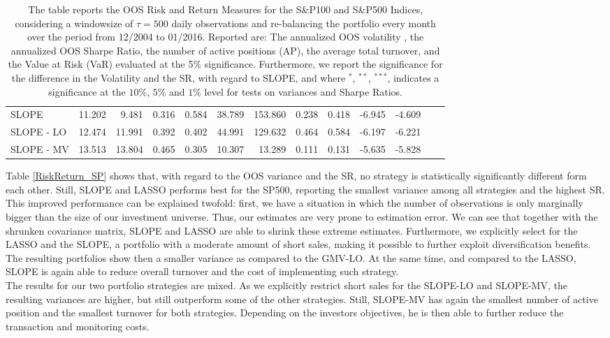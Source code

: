\documentclass[12pt, a4paper]{article}
\begin{document}
\begin{table}[h!]
{\begin{tabular}{ldd dd dd dd dd dd}
    SLOPE & 11.202 & 9.481 & 0.316 & 0.584 & 38.789 & 153.860 & 0.238 & 0.418 & -6.945 & -4.609 \\
    SLOPE - LO & 12.474 & 11.991 & 0.392 & 0.402 & 44.991 & 129.632 & 0.464 & 0.584 & -6.197 & -6.221 \\
    SLOPE - MV & 13.513 & 13.804 & 0.465 & 0.305 & 10.307 & 13.289 & 0.111 & 0.131 & -5.635 & -5.828 \\
    \bottomrule
    \bottomrule
    \end{tabular}%
    }
\captionsetup{font=scriptsize,labelfont=scriptsize, width=\textwidth}
\caption*{The table reports the OOS Risk and Return Measures for the S\&P100 and S\&P500 Indices, considering a windowsize of $\tau = 500$ daily observations and re-balancing the portfolio every month over the period from 12/2004 to 01/2016. Reported are: The annualized OOS volatility , the annualized OOS Sharpe Ratio, the number of active positions (AP), the average total turnover, and the Value at Risk (VaR) evaluated at the 5\% significance. Furthermore, we report the significance for the difference in the Volatility and the SR, with regard to SLOPE, and where $^{*}$, $^{**}$, $^{***}$, indicates a significance at the $10\%$, $5\%$ and $1\%$ level for tests on variances and Sharpe Ratios.}
%
\end{table}%
%
\noindent
Table \ref{RiskReturn_SP} shows that, with regard to the OOS variance and the SR, no strategy is statistically significantly different form each other. 
Still, SLOPE and LASSO performs best for the SP500, reporting the smallest variance among all strategies and the highest SR. This improved performance can be explained twofold: first, we have a situation in which the number of observations is only marginally bigger than the size of our investment universe. Thus, our estimates are very prone to estimation error. We can see that together with the shrunken covariance matrix, SLOPE and LASSO are able to shrink these extreme estimates. Furthermore, we explicitly select for the LASSO and the SLOPE, a portfolio with a moderate amount of short sales, making it possible to further exploit diversification benefits. The resulting portfolios show then a smaller variance as compared to the GMV-LO. At the same time, and compared to the LASSO, SLOPE is again able to reduce overall turnover and the cost of implementing such strategy. \\
The results for our two portfolio strategies are mixed. As we explicitly restrict short sales for the SLOPE-LO and SLOPE-MV, the resulting variances are higher, but still outperform some of the other strategies. Still, SLOPE-MV has again the smallest number of active position and the smallest turnover for both strategies. Depending on the investors objectives, he is then able to further reduce the transaction and monitoring costs. 
\end{document}
